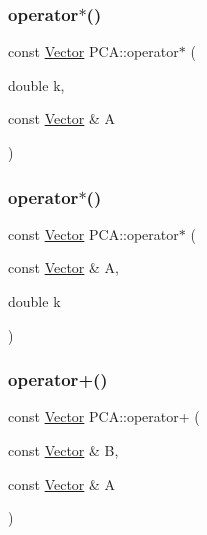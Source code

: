 \hypertarget{namespace_p_c_a_a6f1801f8e53ab87a1f3175ec18fa3115}{}\label{namespace_p_c_a_a6f1801f8e53ab87a1f3175ec18fa3115} 
\subsubsection{\texorpdfstring{operator$\ast$()}{operator*()}\hspace{0.1cm}{\footnotesize\ttfamily [2/3]}}
{\footnotesize\ttfamily const \hyperlink{class_p_c_a_1_1_vector}{Vector} P\+C\+A\+::operator$\ast$ (\begin{DoxyParamCaption}\item[{double}]{k,  }\item[{const \hyperlink{class_p_c_a_1_1_vector}{Vector} \&}]{A }\end{DoxyParamCaption})\hspace{0.3cm}{\ttfamily [inline]}}

\hypertarget{namespace_p_c_a_a58012056e60671ce13c8318b3cd1ec8f}{}\label{namespace_p_c_a_a58012056e60671ce13c8318b3cd1ec8f} 
\subsubsection{\texorpdfstring{operator$\ast$()}{operator*()}\hspace{0.1cm}{\footnotesize\ttfamily [3/3]}}
{\footnotesize\ttfamily const \hyperlink{class_p_c_a_1_1_vector}{Vector} P\+C\+A\+::operator$\ast$ (\begin{DoxyParamCaption}\item[{const \hyperlink{class_p_c_a_1_1_vector}{Vector} \&}]{A,  }\item[{double}]{k }\end{DoxyParamCaption})\hspace{0.3cm}{\ttfamily [inline]}}

\hypertarget{namespace_p_c_a_a017b6648f950fd5e297bc92225a425dc}{}\label{namespace_p_c_a_a017b6648f950fd5e297bc92225a425dc} 
\subsubsection{\texorpdfstring{operator+()}{operator+()}}
{\footnotesize\ttfamily const \hyperlink{class_p_c_a_1_1_vector}{Vector} P\+C\+A\+::operator+ (\begin{DoxyParamCaption}\item[{const \hyperlink{class_p_c_a_1_1_vector}{Vector} \&}]{B,  }\item[{const \hyperlink{class_p_c_a_1_1_vector}{Vector} \&}]{A }\end{DoxyParamCaption})\hspace{0.3cm}{\ttfamily [inline]}}

